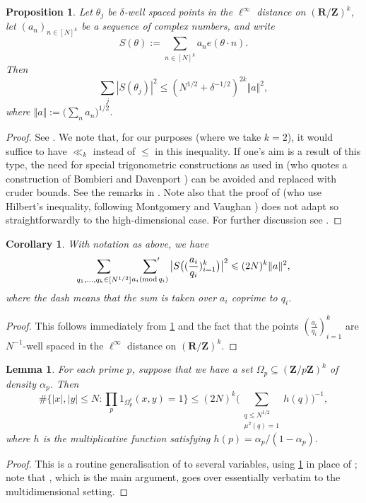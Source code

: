 \documentclass[11pt,reqno]{amsart}
\numberwithin{equation}{section}
\newtheorem{proposition}[theorem]{Proposition}
\newtheorem{lemma}[theorem]{Lemma}
\newtheorem{corollary}[theorem]{Corollary}
\theoremstyle{definition}
\theoremstyle{remark}
\renewcommand{\le}{\leqslant}
\newcommand\Z{\mathbf{Z}}
\newcommand\R{\mathbf{R}}
\newcommand{\mdsublem}[1]{\ensuremath{(\mbox{\scriptsize \textup{mod}}\, #1)}}
\begin{document}
\begin{proposition}\label{multi-ls}
Let $\theta_j$ be $\delta$-well spaced points in the $\ell^{\infty}$ distance on $(\R/\Z)^k$,  let $(a_n)_{n \in [N]^k}$ be a sequence of complex numbers, and write 
\begin{equation}\label{s-theta-def} S(\theta) := \sum_{n \in [N]^k} a_n e (\theta \cdot n).\end{equation}
Then
\[ \sum_j |S(\theta_j)|^2 \le  (N^{1/2} + \delta^{-1/2})^{2k} \Vert a \Vert^2,\]
where $\Vert a \Vert := \big( \sum_n a_n \big)^{1/2}$.
\end{proposition}
\begin{proof}
See \cite[Theorem 1]{huxley}. We note that, for our purposes (where we take $k = 2$), it would suffice to have $\ll_k$ instead of $\le$ in this inequality. If one's aim is a result of this type, the need for special trigonometric constructions as used in \cite{huxley} (who quotes a construction of Bombieri and Davenport \cite{bombieri-davenport}) can be avoided and replaced with cruder bounds. See the remarks in \cite[p177--178]{IK-book}.  Note also that the proof of \cite[Theorem 7.7]{IK-book} (who use Hilbert's inequality, following Montgomery and Vaughan \cite{montgomery-vaughan-paper}) does not adapt so straightforwardly to the high-dimensional case. For further discussion see \cite[Chapter 4]{kowalski-ls}.
\end{proof}

\begin{corollary}\label{ls-cor}
With notation as above, we have
\[ \sum_{q_1,\dots, q_k \in [N^{1/2}] } \sideset{}{'}\sum_{a_i \mdsublem{q_i}} \big|S\big((\frac{a_i}{q_i})_{i = 1}^k\big)\big|^2 \le (2N)^k \Vert a \Vert^2,\] where the dash means that the sum is taken over $a_i$ coprime to $q_i$.
\end{corollary}
\begin{proof}
This follows immediately from  \cref{multi-ls} and the fact that the points $(\frac{a_i}{q_i})_{i = 1}^k$ are $N^{-1}$-well spaced in the $\ell^{\infty}$ distance on $(\R/\Z)^k$. 
\end{proof}


\begin{lemma}\label{large-sieve-higher}
For each prime $p$, suppose that we have a set $\Omega_p \subseteq(\Z/p\Z)^k$ of density $\alpha_p$. Then 
\begin{equation}\label{large-sieve-est} \# \{ |x|, |y| \le N  : \prod_{p} 1_{\Omega_p^c}(x,y)= 1 \} \le (2N)^k \big( \sum_{\substack{q \le N^{1/2} \\ \mu^2(q) = 1}} h(q) \big)^{-1},\end{equation}
where $h$ is the multiplicative function satisfying $h(p) = \alpha_p/(1 - \alpha_p)$.
\end{lemma}
\begin{proof}
This is a routine generalisation of \cite[Theorem 7.14]{IK-book} to several variables, using \cref{ls-cor} in place of \cite[Theorem 7.11]{IK-book}; note that \cite[Lemma 7.15]{IK-book}, which is the main argument, goes over essentially verbatim to the multidimensional setting.
    \end{proof}
\end{document}
